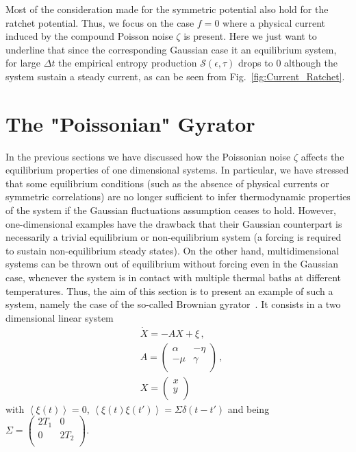 \documentclass[12pt]{iopart}
\newcommand{\lx} {\left}
\newcommand{\rx} {\right}
\newcommand{\eps} {\epsilon}
\newcommand{\ave}[1] {\lx\langle #1 \rx\rangle}
\newcommand{\cS} {\mathcal{S}}
\begin{document}
Most of the consideration made for the symmetric potential also hold for the ratchet potential. Thus, we focus on the case $f=0$ where a physical current induced by the compound Poisson noise $\zeta$ is present. Here we just want to underline that since the corresponding Gaussian case it an equilibrium system, for large $\Delta t$ the empirical entropy production $\cS(\eps,\tau)$ drops to $0$ although the system sustain a steady current, as can be seen from Fig.~\ref{fig:Current_Ratchet}. 
\section{The "Poissonian" Gyrator}
\label{sec:bg}
In the previous sections we have discussed how the Poissonian noise $\zeta$ affects the equilibrium properties of one dimensional systems. In particular, we have stressed that some equilibrium conditions (such as the absence of physical currents or symmetric correlations) are no longer sufficient to infer thermodynamic properties of the system if the Gaussian fluctuations assumption ceases to hold. However, one-dimensional examples have the drawback that their Gaussian counterpart is necessarily a trivial equilibrium or non-equilibrium system (a forcing is required to sustain non-equilibrium steady states). On the other hand, multidimensional systems can be thrown out of equilibrium without forcing even in the Gaussian case, whenever the system is in contact with multiple thermal baths at different temperatures. Thus, the aim of this section is to present an example of such a system, namely the case of the so-called Brownian gyrator~\cite{ciliberto2013heat,ciliberto2013statistical,argun2017experimental}. It consists in a two dimensional linear system
\begin{align}
    &\dot{X}=-AX+\xi\,,\\
    &A=\left(\begin{array}{cc}
    \alpha & -\eta \\
    -\mu & \gamma \\
    \end{array}\right)\,,\nonumber\\
    &X=\left(\begin{array}{c}
    x \\
    y \\
    \end{array}\right)
\end{align}
with $\ave{\xi(t)}=0$, $\ave{\xi(t)\xi(t')}=\Sigma\delta(t-t')$ and being $\Sigma=\left(\begin{array}{cc}
    2T_1 & 0 \\
    0 & 2T_2 \\
    \end{array}\right)$. 
\end{document}
